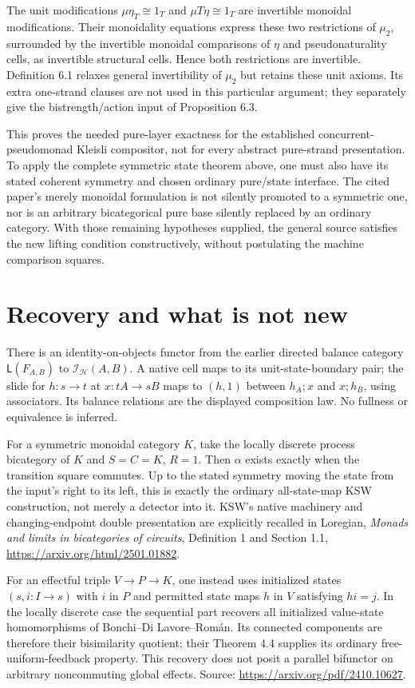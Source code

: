 \documentclass{article}
\begin{document}
The unit modifications $\mu\eta_T\cong1_T$ and $\mu T\eta\cong1_T$ are invertible monoidal modifications. Their monoidality equations express these two restrictions of $\mu_2$, surrounded by the invertible monoidal comparisons of $\eta$ and pseudonaturality cells, as invertible structural cells. Hence both restrictions are invertible. Definition 6.1 relaxes general invertibility of $\mu_2$ but retains these unit axioms. Its extra one-strand clauses are not used in this particular argument; they separately give the bistrength/action input of Proposition 6.3.

This proves the needed pure-layer exactness for the established concurrent-pseudomonad Kleisli compositor, not for every abstract pure-strand presentation. To apply the complete symmetric state theorem above, one must also have its stated coherent symmetry and chosen ordinary pure/state interface. The cited paper's merely monoidal formulation is not silently promoted to a symmetric one, nor is an arbitrary bicategorical pure base silently replaced by an ordinary category. With those remaining hypotheses supplied, the general source satisfies the new lifting condition constructively, without postulating the machine comparison squares. 

\section{Recovery and what is not new}
There is an identity-on-objects functor from the earlier directed balance category $\mathsf L(F_{A,B})$ to $\mathcal I_{\mathcal H}(A,B)$. A native cell maps to its unit-state-boundary pair; the slide for $h:s\to t$ at $x:tA\to sB$ maps to $(h,1)$ between $h_A;x$ and $x;h_B$, using associators. Its balance relations are the displayed composition law. No fullness or equivalence is inferred.

For a symmetric monoidal category $K$, take the locally discrete process bicategory of $K$ and $S=C=K$, $R=1$. Then $\alpha$ exists exactly when the transition square commutes. Up to the stated symmetry moving the state from the input's right to its left, this is exactly the ordinary all-state-map KSW construction, not merely a detector into it. KSW's native machinery and changing-endpoint double presentation are explicitly recalled in Loregian, \emph{Monads and limits in bicategories of circuits}, Definition 1 and Section 1.1, \url{https://arxiv.org/html/2501.01882}.

For an effectful triple $V\to P\to K$, one instead uses initialized states $(s,i:I\to s)$ with $i$ in $P$ and permitted state maps $h$ in $V$ satisfying $hi=j$. In the locally discrete case the sequential part recovers all initialized value-state homomorphisms of Bonchi--Di Lavore--Rom\'an. Its connected components are therefore their bisimilarity quotient; their Theorem 4.4 supplies its ordinary free-uniform-feedback property. This recovery does not posit a parallel bifunctor on arbitrary noncommuting global effects. Source: \url{https://arxiv.org/pdf/2410.10627}.
\end{document}
